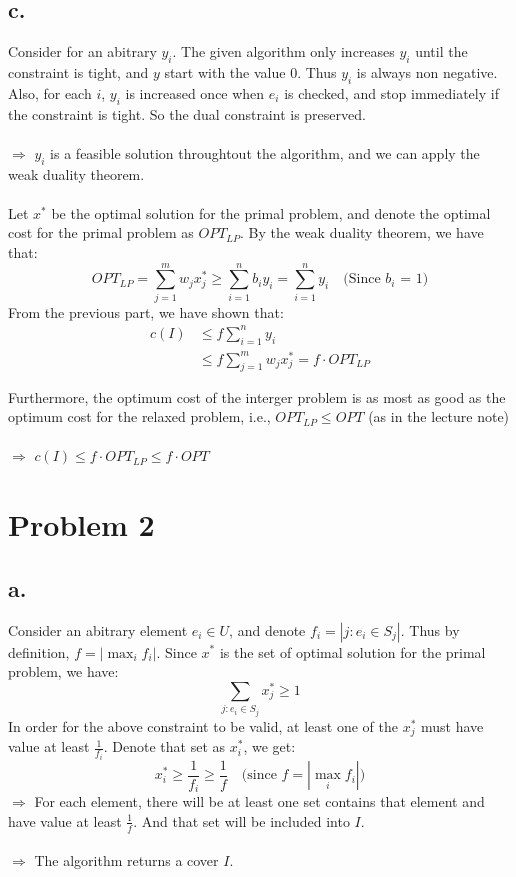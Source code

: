 \documentclass{article}
\begin{document}
\subsection*{c.}
Consider for an abitrary $y_i$. The given algorithm only increases $y_i$ until the constraint is tight, and $y$ start with the value 0. Thus $y_i$ is always non negative. Also, for each $i$, $y_i$ is increased once when $e_i$ is checked, and stop immediately if the constraint is tight. So the dual constraint is preserved.  \\\\
$\Rightarrow$ $y_i$ is a feasible solution throughtout the algorithm, and we can apply the weak duality theorem. \\\\
Let $x^*$ be the optimal solution for the primal problem, and denote the optimal cost for the primal problem as $OPT_{LP}$. By the weak duality theorem, we have that:
\[
OPT_{LP} = \sum_{j=1}^{m}w_{j}x^{*}_{j} \geq \sum_{i=1}^{n}b_{i}y_{i} = \sum_{i=1}^{n}y_{i} \quad \text{(Since $b_{i}$ = 1)}
\]
From the previous part, we have shown that:
\[
\begin{aligned}
c(I) &\leq f \sum_{i=1}^{n}y_{i} \\
&\leq f\sum_{j=1}^{m}w_{j}x^{*}_{j} = f \cdot OPT_{LP} \\\\
\end{aligned}
\]
Furthermore, the optimum cost of the interger problem is as most as good as the optimum cost for the relaxed problem, i.e., $OPT_{LP} \leq OPT$ (as in the lecture note) \\\\
$\Longrightarrow$ $c(I) \leq f \cdot OPT_{LP} \leq f \cdot OPT$

\pagebreak
\section*{Problem 2}
\subsection*{a.}
Consider an abitrary element $e_{i} \in U$, and denote $f_i = |{j:e_i\in S_j}|$. Thus by definition, $f = |\max_{i} f_{i}|$. Since $x^*$ is the set of optimal solution for the primal problem, we have:
\[
\sum_{j:e_{i} \in S_{j}}x^{*}_{j} \geq 1
\]
In order for the above constraint to be valid, at least one of the $x^{*}_{j}$ must have value at least $\frac{1}{f_i}$. Denote that set as $x^{*}_{i}$, we get:
\[
x^{*}_{i} \geq \frac{1}{f_i} \geq \frac{1}{f} \quad\text{(since $f = |\max_{i} f_{i}|$)}
\]
$\Rightarrow$ For each element, there will be at least one set contains that element and have value at least $\frac{1}{f}$. And that set will be included into $I$. \\\\
$\Longrightarrow$ The algorithm returns a cover $I$.
\end{document}
